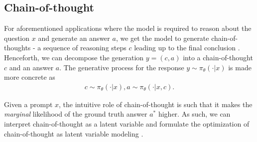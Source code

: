 \documentclass{article}
\theoremstyle{definition}
\begin{document}
\subsection{Chain-of-thought}

For aforementioned applications where the model is required to reason about the question $x$ and generate an answer $a$, we get the model to generate chain-of-thoughts - a sequence of reasoning steps $c$ leading up to the final conclusion \citep{ling2017program,wei2022chain}. Henceforth, we can decompose the generation $y=(c,a)$ into a chain-of-thought $c$ and an answer $a$. The generative process for the response $y\sim \pi_\theta(\cdot|x)$ is made more concrete as
\begin{align}
    c\sim \pi_\theta(\cdot|x), a\sim \pi_\theta(\cdot|x,c).\label{eq:cot-generative}
\end{align}

Given a prompt $x$, the intuitive role of chain-of-thought is such that it makes the \emph{marginal} likelihood of the ground truth answer $a^\ast$ higher. As such, we can interpret chain-of-thought as a latent variable and formulate the optimization of chain-of-thought as latent variable modeling  \citep{hu2024unveiling,hoffman2024training}.
\end{document}
